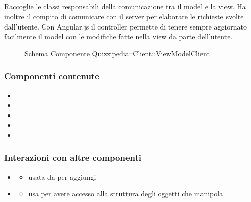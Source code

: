\subsection{}
Raccoglie le classi responsabili della comunicazione tra il model e la view. Ha inoltre il compito di comunicare con il server per elaborare le richieste svolte dall'utente.
Con Angular.js il controller permette di tenere sempre aggiornato facilmente il model con le modifiche fatte nella view da parte dell'utente.
\begin{figure}[H]
\centering
\noindent{}
\caption[Schema Componente Quizzipedia::Client::ViewModelClient]{Schema Componente Quizzipedia::Client::ViewModelClient}
\end{figure}
\subsubsection{Componenti contenute}
\begin{itemize}
\item {}
\item {}
\item {}
\item {}
\item {}
\end{itemize}
\subsubsection{Interazioni con altre componenti}
\begin{itemize}
\item {}
\begin{itemize}
\item usata da  per aggiungi
\end{itemize}
\item {}
\begin{itemize}
\item usa  per avere accesso alla struttura degli oggetti che manipola
\end{itemize}
\end{itemize}
